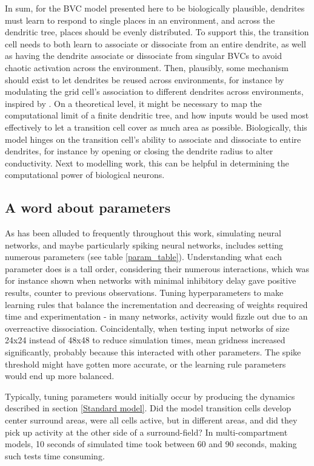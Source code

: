 \documentclass{article}
\begin{document}
    In sum, for the BVC model presented here to be biologically plausible, dendrites must learn to respond to single places in an environment, and across the dendritic tree, places should be evenly distributed. To support this, the transition cell needs to both learn to associate or dissociate from an entire dendrite, as well as having the dendrite associate or dissociate from singular BVCs to avoid chaotic activation across the environment. Then, plausibly, some mechanism should exist to let dendrites be reused across environments, for instance by modulating the grid cell's association to different dendrites across environments, inspired by \parencite{Alabi2022}. 
    On a theoretical level, it might be necessary to map the computational limit of a finite dendritic tree, and how inputs would be used most effectively to let a transition cell cover as much area as possible. Biologically, this model hinges on the transition cell's ability to associate and dissociate to entire dendrites, for instance by opening or closing the dendrite radius to alter conductivity. Next to modelling work, this can be helpful in determining the computational power of biological neurons.

    \subsection{A word about parameters}\label{ParameterDiscussion}

    As has been alluded to frequently throughout this work, simulating neural networks, and maybe particularly spiking neural networks, includes setting numerous parameters (see table \ref{param_table}). Understanding what each parameter does is a tall order, considering their numerous interactions, which was for instance shown when networks with minimal inhibitory delay gave positive results, counter to previous observations. Tuning hyperparameters to make learning rules that balance the incrementation and decreasing of weights required time and experimentation - in many networks, activity would fizzle out due to an overreactive dissociation. Coincidentally, when testing input networks of size 24x24 instead of 48x48 to reduce simulation times, mean gridness increased significantly, probably because this interacted with other parameters. The spike threshold might have gotten more accurate, or the learning rule parameters would end up more balanced.

    Typically, tuning parameters would initially occur by producing the dynamics described in section \ref{Standard model}. Did the model transition cells develop center surround areas, were all cells active, but in different areas, and did they pick up activity at the other side of a surround-field? In multi-compartment models, 10 seconds of simulated time took between 60 and 90 seconds, making such tests time consuming.
    
\end{document}
